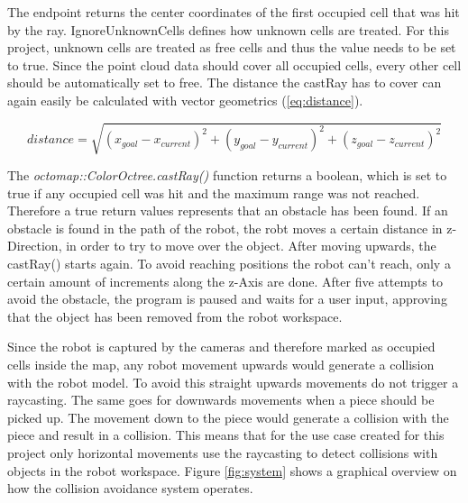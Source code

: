 The endpoint returns the center coordinates of the first occupied cell that was hit by the ray. IgnoreUnknownCells defines how unknown cells are treated. For this project, unknown cells are treated as free cells and thus the value needs to be set to true. Since the point cloud data should cover all occupied cells, every other cell should be automatically set to free.
The distance the castRay has to cover can again easily be calculated with vector geometrics (\ref{eq:distance}).

\begin{equation}
\label{eq:distance}
	distance = \sqrt{(x_{goal}-x_{current})^2 + (y_{goal}-y_{current})^2 + (z_{goal}-z_{current})^2}
\end{equation}

The \emph{octomap::ColorOctree.castRay()} function returns a boolean, which is set to true if any occupied cell was hit and the maximum range was not reached. Therefore a true return values represents that an obstacle has been found. If an obstacle is found in the path of the robot, the robt moves a certain distance in z-Direction, in order to try to move over the object. After moving upwards, the castRay() starts again. To avoid reaching positions the robot can't reach, only a certain amount of increments along the z-Axis are done. After five attempts to avoid the obstacle, the program is paused and waits for a user input, approving that the object has been removed from the robot workspace.

Since the robot is captured by the cameras and therefore marked as occupied cells inside the map, any robot movement upwards  would generate a collision with the robot model. To avoid this straight upwards movements do not trigger a raycasting. The same goes for downwards movements when a piece should be picked up. The movement down to the piece would generate a collision with the piece and result in a collision. This means that for the use case created for this project only horizontal movements use the raycasting to detect collisions with objects in the robot workspace. Figure \ref{fig:system} shows a graphical overview on how the collision avoidance system operates.

